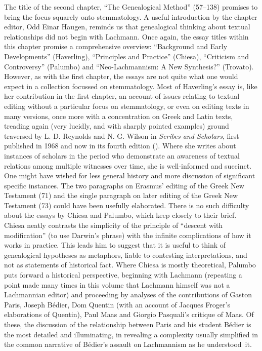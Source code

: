 \documentclass{article}
\begin{document}
The title of the second chapter, ``The Genealogical Method''
(57--138) promises to bring the focus squarely onto stemmatology. A
useful introduction by the chapter editor, Odd Einar Haugen, reminds us
that genealogical thinking about textual relationships did not begin
with Lachmann. Once again, the essay titles within this chapter promise
a comprehensive overview: ``Background and Early Developments''
(Haverling), ``Principles and Practice'' (Chiesa), ``Criticism and
Controversy'' (Palumbo) and ``Neo-Lachmannism: A New Synthesis?''
(Trovato). However, as with the first chapter, the essays are not quite
what one would expect in a collection focussed on stemmatology. Most of
Haverling's essay is, like her contribution in the first chapter, an
account of issues relating to textual editing without a particular focus
on stemmatology, or even on editing texts in many versions, once more
with a concentration on Greek and Latin texts, treading again (very
lucidly, and with sharply pointed examples) ground traversed by L. D.
Reynolds and N. G. Wilson in \emph{Scribes and Scholars}, first
published in 1968 and now in its fourth edition (\citeyear{reynolds_scribes_2013}). Where she writes
about instances of scholars in the period who demonstrate an awareness
of textual relations among multiple witnesses over time, she is
well-informed and succinct. One might have wished for less general
history and more discussion of significant specific instances. The two
paragraphs on Erasmus' editing of the Greek New Testament (71) and the
single paragraph on later editing of the Greek New Testament (73) could
have been usefully elaborated. There is no such difficulty about the
essays by Chiesa and Palumbo, which keep closely to their brief. Chiesa
neatly contrasts the simplicity of the principle of ``descent with
modification'' (to use Darwin's phrase) with the infinite complications
of how it works in practice. This leads him to suggest that it is useful
to think of genealogical hypotheses as metaphors, liable to contesting
interpretations, and not as statements of historical fact. Where Chiesa
is mostly theoretical, Palumbo puts forward a historical perspective,
beginning with Lachmann (repeating a point made many times in this
volume that Lachmann himself was not a Lachmannian editor) and
proceeding by analyses of the contributions of Gaston Paris, Joseph
Bédier, Dom Quentin (with an account of Jacques Froger's elaborations of
Quentin), Paul Maas and Giorgio Pasquali's critique of Maas. Of these,
the discussion of the relationship between Paris and his student Bédier
is the most detailed and illuminating, in revealing a complexity usually
simplified in the common narrative of Bédier's assault on Lachmannism as
he \mbox{understood it}.
\end{document}
